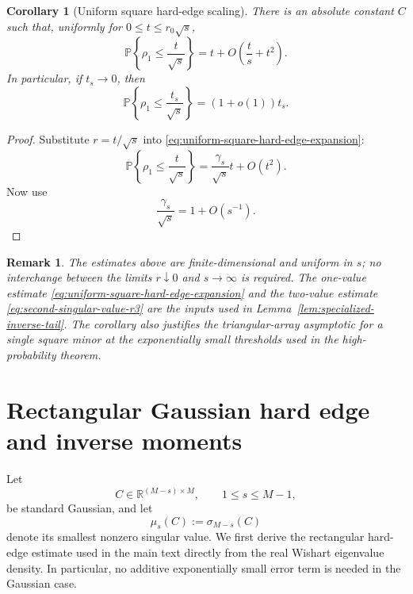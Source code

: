 \documentclass[11pt]{article}
\newtheorem{corollary}{Corollary}
\newtheorem{remark}{Remark}
\newcommand{\R}{\mathbb R}
\newcommand{\Pbb}{\mathbb P}
\newcommand{\1}{\mathbf 1}
\begin{document}
\begin{corollary}[Uniform square hard-edge scaling]
\label{cor:uniform-square-hard-edge-scaling}
There is an absolute constant \(C\) such that, uniformly for
\(0\le t\le r_0\sqrt{s}\),
\begin{equation}
        \Pbb\left\{
        \rho_1\le\frac{t}{\sqrt{s}}
        \right\}
        =
        t
        +
        O\left(
        \frac{t}{s}+t^2
        \right).
        \label{eq:uniform-square-hard-edge-scaled}
\end{equation}
In particular, if \(t_s\to0\), then
\begin{equation}
        \Pbb\left\{
        \rho_1\le\frac{t_s}{\sqrt{s}}
        \right\}
        =
        (1+o(1))t_s.
        \label{eq:triangular-square-hard-edge}
\end{equation}
\end{corollary}

\begin{proof}
Substitute \(r=t/\sqrt{s}\) into
\eqref{eq:uniform-square-hard-edge-expansion}:
\[
        \Pbb\left\{
        \rho_1\le\frac{t}{\sqrt{s}}
        \right\}
        =
        \frac{\gamma_s}{\sqrt{s}}t+O(t^2).
\]
Now use
\[
        \frac{\gamma_s}{\sqrt{s}}
        =
        1+O(s^{-1}).
\]
\end{proof}

\begin{remark}
The estimates above are finite-dimensional and uniform in \(s\); no interchange between
the limits \(r\downarrow0\) and \(s\to\infty\) is required.  The one-value estimate
\eqref{eq:uniform-square-hard-edge-expansion} and the two-value estimate
\eqref{eq:second-singular-value-r3} are the inputs used in
Lemma~\ref{lem:specialized-inverse-tail}.  The corollary also justifies the triangular-array
asymptotic for a single square minor at the exponentially small thresholds used in the
high-probability theorem.
\end{remark}

\section{Rectangular Gaussian hard edge and inverse moments}
\label{app:rectangular-hard-edge}

Let
\[
        C\in\R^{(M-s)\times M},
        \qquad
        1\le s\le M-1,
\]
be standard Gaussian, and let
\[
        \mu_s(C):=\sigma_{M-s}(C)
\]
denote its smallest nonzero singular value.  We first derive the rectangular hard-edge
estimate used in the main text directly from the real Wishart eigenvalue density.  In
particular, no additive exponentially small error term is needed in the Gaussian case.
\end{document}
